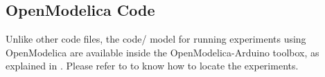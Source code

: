 




\subsection{OpenModelica Code}
\label{sec:dcmotor-OpenModelica-code}
Unlike other code files, the code/ model for running experiments using OpenModelica are 
available inside the OpenModelica-Arduino toolbox, as explained in .
Please refer to  to know how to locate the experiments. 

